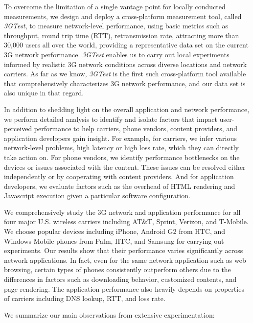 To overcome the limitation of a single vantage point for locally
conducted measurements, we design and deploy a cross-platform
measurement tool, called {\em 3GTest}, to measure network-level 
performance, using basic metrics such as throughput, round trip 
time (RTT), retransmission rate, \etc attracting more than 30,000 
users all over the world, providing a representative data set on 
the current 3G network performance. {\em 3GTest} enables us to 
carry out local experiments informed by realistic 3G network 
conditions across diverse locations and network carriers. As far 
as we know, \emph{3GTest} is the first such cross-platform tool 
available that comprehensively characterizes 3G network performance, 
and our data set is also unique in that regard.

In addition to shedding light on the overall application and network
performance, we perform detailed analysis to identify and isolate
factors that impact user-perceived performance to help carriers,
phone vendors, content providers, and application developers gain 
insight. For example, for carriers, we infer various network-level 
problems, \eg high latency or high loss rate, which they can directly 
take action on. For phone vendors, we identify performance bottlenecks 
on the devices or issues associated with the content. These issues can
be resolved either independently or by cooperating with content 
providers. And for application developers, we evaluate factors such 
as the overhead of HTML rendering and Javascript execution given a 
particular software configuration.

We comprehensively study the 3G network and application performance
for all four major U.S. wireless carriers including AT\&T, Sprint,
Verizon, and T-Mobile. We choose popular devices including iPhone,
Android G2 from HTC, and Windows Mobile phones from Palm, HTC, and 
Samsung for carrying out experiments. Our results show that their
performance varies significantly across network applications. In 
fact, even for the same network application such as web browsing, 
certain types of phones consistently outperform others due to the 
differences in factors such as downloading behavior, customized 
contents, and page rendering. The application performance also 
heavily depends on properties of carriers including DNS lookup, 
RTT, and loss rate.

We summarize our main observations from extensive experimentation:

